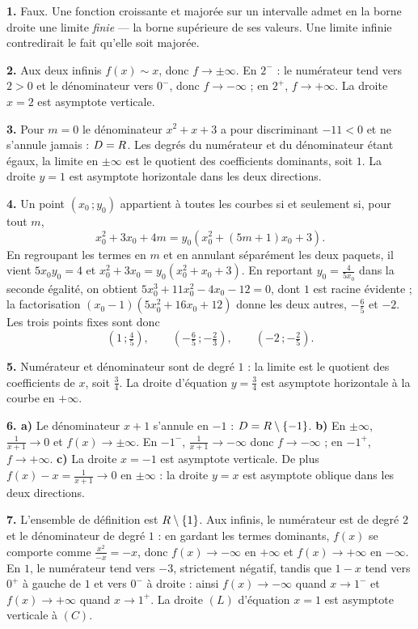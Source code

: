 \begin{corrige}[annales]
\textbf{1.} Faux. Une fonction croissante et majorée sur un intervalle admet
en la borne droite une limite \emph{finie} — la borne supérieure de ses
valeurs. Une limite infinie contredirait le fait qu'elle soit majorée.

\textbf{2.} Aux deux infinis $f(x) \sim x$, donc $f \to \pm\infty$. En $2^{-}$ :
le numérateur tend vers $2>0$ et le dénominateur vers $0^{-}$, donc
$f \to -\infty$ ; en $2^{+}$, $f \to +\infty$. La droite $x = 2$ est asymptote
verticale.

\textbf{3.} Pour $m = 0$ le dénominateur $x^{2}+x+3$ a pour discriminant
$-11<0$ et ne s'annule jamais : $D = R$. Les degrés du numérateur et du
dénominateur étant égaux, la limite en $\pm\infty$ est le quotient des
coefficients dominants, soit $1$. La droite $y = 1$ est asymptote horizontale
dans les deux directions.

\textbf{4.} Un point $(x_{0}\,;y_{0})$ appartient à toutes les courbes si et
seulement si, pour tout $m$,
\[
  x_{0}^{2}+3x_{0}+4m
  = y_{0}\left(x_{0}^{2}+(5m+1)x_{0}+3\right).
\]
En regroupant les termes en $m$ et en annulant séparément les deux paquets, il
vient $5x_{0}y_{0} = 4$ et $x_{0}^{2}+3x_{0} = y_{0}\left(x_{0}^{2}+x_{0}
+3\right)$. En reportant $y_{0} = \frac{4}{5x_{0}}$ dans la seconde égalité,
on obtient $5x_{0}^{3}+11x_{0}^{2}-4x_{0}-12 = 0$, dont $1$ est racine
évidente ; la factorisation $(x_{0}-1)\left(5x_{0}^{2}+16x_{0}+12\right)$
donne les deux autres, $-\frac65$ et $-2$. Les trois points fixes sont donc
\[
  \left(1\,;\tfrac45\right), \qquad
  \left(-\tfrac65\,;-\tfrac23\right), \qquad
  \left(-2\,;-\tfrac25\right).
\]

\textbf{5.} Numérateur et dénominateur sont de degré $1$ : la limite est le
quotient des coefficients de $x$, soit $\frac34$. La droite d'équation
$y = \frac34$ est asymptote horizontale à la courbe en $+\infty$.

\textbf{6. a)} Le dénominateur $x+1$ s'annule en $-1$ :
$D = R\setminus\{-1\}$.
\textbf{b)} En $\pm\infty$, $\frac{1}{x+1}\to0$ et $f(x)\to\pm\infty$. En
$-1^{-}$, $\frac{1}{x+1}\to-\infty$ donc $f\to-\infty$ ; en $-1^{+}$,
$f\to+\infty$.
\textbf{c)} La droite $x = -1$ est asymptote verticale. De plus
$f(x)-x = \frac{1}{x+1}\to0$ en $\pm\infty$ : la droite $y = x$ est asymptote
oblique dans les deux directions.

\textbf{7.} L'ensemble de définition est $R\setminus\{1\}$. Aux infinis, le
numérateur est de degré $2$ et le dénominateur de degré $1$ : en gardant les
termes dominants, $f(x)$ se comporte comme $\frac{x^{2}}{-x} = -x$, donc
$f(x)\to-\infty$ en $+\infty$ et $f(x)\to+\infty$ en $-\infty$. En $1$, le
numérateur tend vers $-3$, strictement négatif, tandis que $1-x$ tend vers
$0^{+}$ à gauche de $1$ et vers $0^{-}$ à droite : ainsi
$f(x)\to-\infty$ quand $x\to1^{-}$ et $f(x)\to+\infty$ quand $x\to1^{+}$. La
droite $(L)$ d'équation $x = 1$ est asymptote verticale à $(C)$.


\end{corrige}
